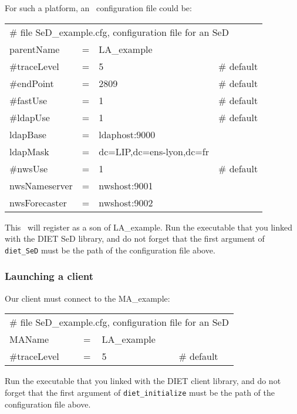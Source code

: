 For such a platform, an \sed\ configuration file could be:
\tt
\begin{center}
 \footnotesize
 \begin{tabular}{lcll}
  \multicolumn{4}{l}{\# file SeD\_example.cfg, configuration file for an SeD}\\
  parentName   &=&LA\_example        &\\
  \#traceLevel &=&5                 &\# default\\
  \#endPoint   &=&2809              &\# default\\
  \#fastUse    &=&1                 &\# default\\
  \#ldapUse    &=&1                 &\# default\\
  ldapBase     &=&ldaphost:9000     &\\
  ldapMask     &=&dc=LIP,dc=ens-lyon,dc=fr&\\
  \#nwsUse     &=&1                 &\# default\\
  nwsNameserver&=&nwshost:9001      &\\
  nwsForecaster&=&nwshost:9002      &\\
 \end{tabular}
\end{center}
\rm

This \sed\ will register as a son of LA\_example. Run the executable that you
linked with the DIET SeD library, and do not forget that the first argument of
\texttt{diet\_SeD} must be the path of the configuration file above.


\subsubsection{Launching a client}

Our client must connect to the MA\_example:
\tt
\begin{center}
 \footnotesize
 \begin{tabular}{lcll}
  \multicolumn{4}{l}{\# file SeD\_example.cfg, configuration file for an SeD}\\
  MAName       &=&LA\_example        &\\
  \#traceLevel &=&5                 &\# default\\
 \end{tabular}
\end{center}
\rm

Run the executable that you linked with the DIET client library, and do not
forget that the first argument of \texttt{diet\_initialize} must be the path of
the configuration file above.

